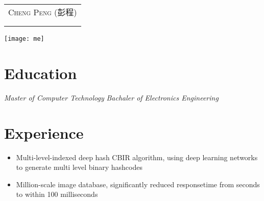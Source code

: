 \documentclass{resume}
\begin{document}

\begin{minipage}{0.7\textwidth}
  \Large{
    \begin{tabu}  { l }
	    \scshape{Cheng \quad  Peng (彭程)} \\
       \\
       \\
    \end{tabu}
  }
\end{minipage}
\begin{minipage}{0.3\textwidth}
  \raggedleft
  \texttt{[image: me]}
\end{minipage}

\section{Education}
\textit{Master of Computer Technology } 
\textit{Bachaler of Electronics Engineering }

\section{Experience}

\begin{itemize}[topsep = 0 pt, partopsep = 0pt]
  \item Multi-level-indexed deep hash CBIR algorithm, using deep learning networks to generate multi level  binary hashcodes
  \item Million-scale image database, significantly reduced responsetime from seconds to within 100 milliseconds
\end{itemize}
\end{document}
